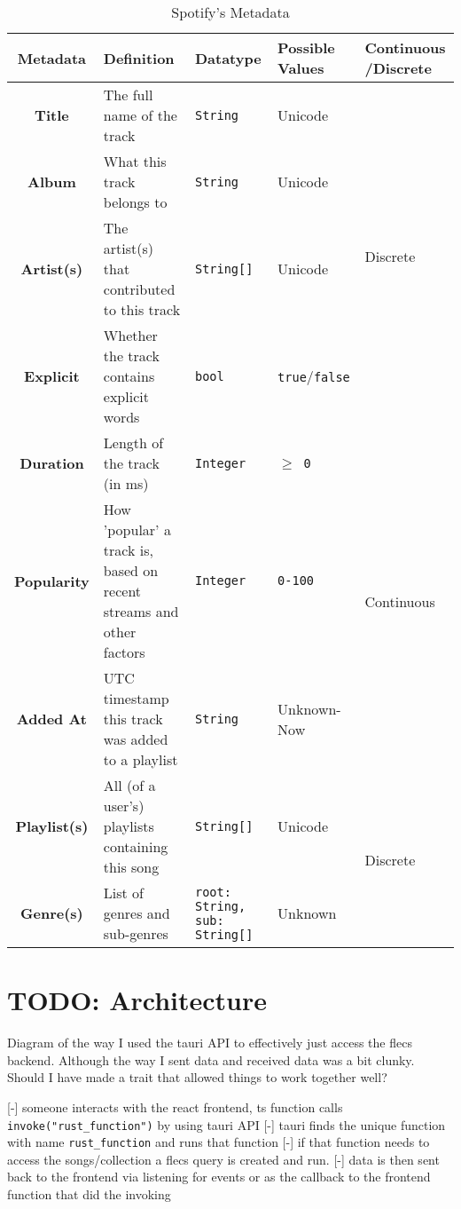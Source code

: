 \begin{longtable}[c]{|c|p{7.5em}|p{7.5em}|p{5em}|p{5.5em}|}
    \caption{Spotify's Metadata}\\%
    \toprule
    \textbf{Metadata} & \textbf{Definition} & \textbf{Datatype} & \textbf{Possible Values} & \textbf{Continuous /Discrete} \\
    \midrule
    \endfirsthead

    \textbf{Title} & The full name of the track & \texttt{String} & Unicode & \multirow{4}{*}{Discrete} \\*
    \cmidrule{1-4}
    \textbf{Album} & What this track belongs to & \texttt{String} & Unicode & \\*
    \cmidrule{1-4}
    \textbf{Artist(s)} & The artist(s) that contributed to this track & \texttt{String[]} & Unicode & \\*
    \cmidrule{1-4}
    \textbf{Explicit} & Whether the track contains explicit words & \texttt{bool} & \texttt{true}/\texttt{false} & \\*
    \cmidrule{1-5}
    \textbf{Duration} & Length of the track (in ms) & \texttt{Integer} & \texttt{\(\ge\) 0} & \multirow{3}{*}{Continuous}\\*
    \cmidrule{1-4}
    \textbf{Popularity} & How 'popular' a track is, based on recent streams and other factors& \texttt{Integer} & \texttt{0-100} & \\*
    \cmidrule{1-4}
    \textbf{Added At} & UTC timestamp this track was added to a playlist & \texttt{String} & Unknown-Now&\\*
    \cmidrule{1-5}
    \textbf{Playlist(s)} & All (of a user's) playlists containing this song & \texttt{String[]} & Unicode & \multirow{2}{*}{Discrete}\\*
    \cmidrule{1-4}
    \textbf{Genre(s)} & List of genres and sub-genres & \texttt{root: String, sub: String[]} & Unknown &\\*
    \midrule
\end{longtable}

\section{TODO: Architecture}%
Diagram of the way I used the tauri API to effectively just access the flecs backend. Although the way I sent data and received data was a bit clunky. Should I have made a trait that allowed things to work together well?

[-] someone interacts with the react frontend, ts function calls \texttt{invoke("rust\_function")} by using tauri API
[-] tauri finds the unique function with name \texttt{rust\_function} and runs that function
[-] if that function needs to access the songs/collection a flecs query is created and run.
[-] data is then sent back to the frontend via listening for events or as the callback to the frontend function that did the invoking

